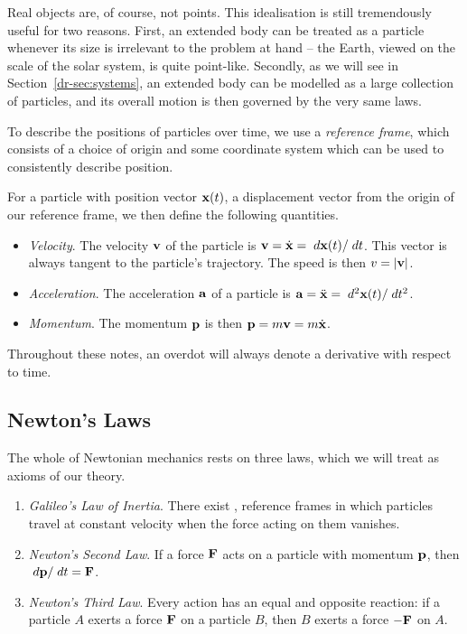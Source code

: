 \documentclass[a4paper]{scrartcl}
\begin{document}
Real objects are, of course, not points. This idealisation is still tremendously useful for two reasons. First, an extended body can be treated as a particle whenever its size is irrelevant to the problem at hand -- the Earth, viewed on the scale of the solar system, is quite point-like. Secondly, as we will see in Section~\ref{dr-sec:systems}, an extended body can be modelled as a large collection of particles, and its overall motion is then governed by the very same laws.

To describe the positions of particles over time, we use a \emph{reference frame}, which consists of a choice of origin and some coordinate system which can be used to consistently describe position.

For a particle with position vector $\mathbf{x}(t)$, a displacement vector from the origin of our reference frame, we then define the following quantities.
\begin{itemize}
	\item \emph{Velocity}. The velocity $\mathbf{v}$ of the particle is $\mathbf{v} = \dot{\mathbf{x}} = \; d \mathbf{x}(t) / \; d t$. This vector is always tangent to the particle's trajectory. The speed is then $v = |\mathbf{v}|$.
	\item \emph{Acceleration}. The acceleration $\mathbf{a}$ of a particle is $\mathbf{a} = \ddot{\mathbf{x}} = \; d^2 \mathbf{x}(t)/\; d t^2$.
	\item \emph{Momentum}. The momentum $\mathbf{p}$ is then $\mathbf{p} = m \mathbf{v} = m \dot{\mathbf{x}}$.
\end{itemize}
Throughout these notes, an overdot will always denote a derivative with respect to time.

\subsection{Newton's Laws}

The whole of Newtonian mechanics rests on three laws, which we will treat as axioms of our theory.

\begin{law}
	\begin{enumerate}
		\item \emph{Galileo's Law of Inertia}. There exist , reference frames in which particles travel at constant velocity when the force acting on them vanishes.
		\item \emph{Newton's Second Law}. If a force $\mathbf{F}$ acts on a particle with momentum $\mathbf{p}$, then $\; d\mathbf{p}/\; d t = \mathbf{F}$.
		\item \emph{Newton's Third Law}. Every action has an equal and opposite reaction: if a particle $A$ exerts a force $\mathbf{F}$ on a particle $B$, then $B$ exerts a force $-\mathbf{F}$ on $A$.
	\end{enumerate}
\end{law}
\end{document}
